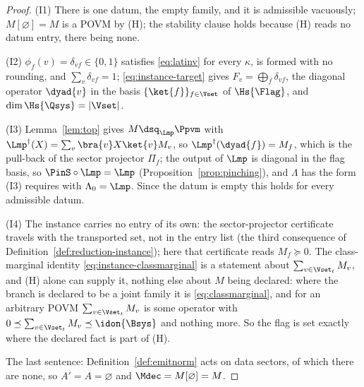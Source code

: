 \begin{proof}
(I1) There is one datum, the empty family, and it is admissible vacuously;
$M[\varnothing]=M$ is a POVM by (H); the stability clause holds because (H)
reads no datum entry, there being none.

(I2) $\phi_f(v)=\delta_{vf}\in\{0,1\}$ satisfies \eqref{eq:latinv} for every
$\kappa$, is formed with no rounding, and $\sum_v\delta_{vf}=1$;
\eqref{eq:instance-target} gives $F_v=\bigoplus_f\delta_{vf}$, the diagonal
operator $\dyad{v}$ in the basis $\{\ket{f}\}_{f\in\Vset}$ of $\Hs{\Flag}$,
and $\dim\Hs{\Qsys}=|\Vset|$.

(I3) Lemma~\ref{lem:top} gives $M\dsq_{\Lmp}\Ppvm$ with
$\Lmp^{\dagger}(X)=\sum_v\bra{v}X\ket{v}M_v$, so
$\Lmp^{\dagger}(\dyad{f})=M_f$, which is the pull-back of the sector
projector $\Pi_f$; the output of $\Lmp$ is diagonal in the flag basis, so
$\PinS\circ\Lmp=\Lmp$ (Proposition~\ref{prop:pinching}), and $\Lambda$ has
the form (I3) requires with $\Lambda_0=\Lmp$. Since the datum is empty this
holds for every admissible datum.

(I4) The instance carries no entry of its own: the sector-projector
certificate travels with the transported set, not in the entry list (the
third consequence of Definition~\ref{def:reduction-instance}); here that
certificate reads $M_f\succeq0$. The class-marginal identity
\eqref{eq:instance-classmarginal} is a statement about
$\sum_{v\in\Vset_t}M_v$, and (H) alone can supply it, nothing else about $M$
being declared: where the branch is declared to be a joint family it is
\eqref{eq:classmarginal}, and for an arbitrary POVM
$\sum_{v\in\Vset_t}M_v$ is some operator with
$0\preceq\sum_{v\in\Vset_t}M_v\preceq\idon{\Bsys}$ and nothing more. So the
flag is set exactly where the declared fact is part of (H).

The last sentence: Definition~\ref{def:emitnorm} acts on data sectors, of
which there are none, so $A'=A=\varnothing$ and $\Mdec=M[\varnothing]=M$.
\end{proof}
